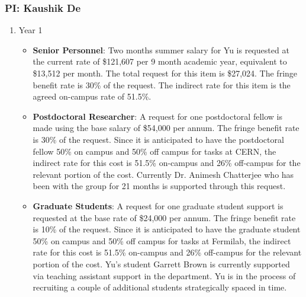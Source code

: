 \newpage


\subsubsection{\bf PI: Kaushik De}

\begin{enumerate}

\item{Year 1}
\begin{itemize}
\item{{\bf Senior Personnel}: Two months summer salary for Yu is requested at the current rate of \$121,607 per 9 month academic year, equivalent to \$13,512 per month.  The total request for this item is \$27,024.   The fringe benefit rate is 30\% of the request.  The indirect rate for this item is the agreed on-campus rate of 51.5\%. }

\item {{\bf Postdoctoral Researcher}: A request for one postdoctoral fellow is made using the base salary of \$54,000 per annum.  The fringe benefit rate is 30\% of the request.  Since it is anticipated to have the postdoctoral fellow 50\% on campus and 50\% off campus for tasks at CERN, the indirect rate for this cost is 51.5\% on-campus and 26\% off-campus for the relevant portion of the cost.  Currently Dr. Animesh Chatterjee who has been with the group for 21 months is supported through this request.} 


\item{{\bf Graduate Students}: A request for one graduate student support is requested at the base rate of \$24,000 per annum.   The fringe benefit rate is 10\% of the request.  Since it is anticipated to have the graduate student 50\% on campus and 50\% off campus for tasks at Fermilab, the indirect rate for this cost is 51.5\% on-campus and 26\% off-campus for the relevant portion of the cost.   Yu’s student Garrett Brown is currently supported via teaching assistant support in the department.   Yu is in the process of recruiting a couple of additional students strategically spaced in time. }



\end{itemize}
\end{enumerate}
